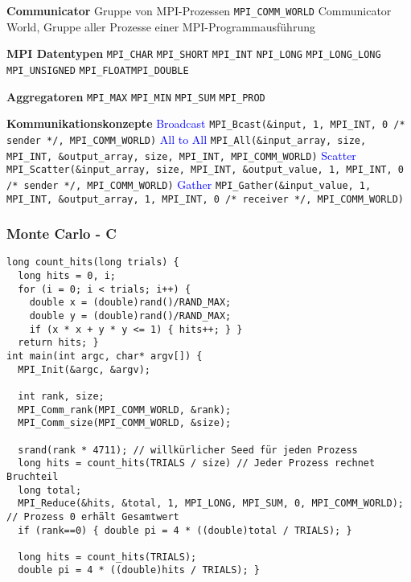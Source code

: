 \textbf{Communicator} Gruppe von MPI-Prozessen \lstinline{MPI_COMM_WORLD} Communicator World, Gruppe aller Prozesse einer MPI-Programmausführung

\textbf{MPI Datentypen} \lstinline{MPI_CHAR} \lstinline{MPI_SHORT} \lstinline{MPI_INT} \lstinline{NPI_LONG} \lstinline{MPI_LONG_LONG} \lstinline{MPI_UNSIGNED} \lstinline{MPI_FLOAT}\lstinline{MPI_DOUBLE}

\textbf{Aggregatoren} \lstinline{MPI_MAX} \lstinline{MPI_MIN} \lstinline{MPI_SUM} \lstinline{MPI_PROD}

\textbf{Kommunikationskonzepte}
\textcolor{blue}{Broadcast} \lstinline{MPI_Bcast(&input, 1, MPI_INT, 0 /* sender */, MPI_COMM_WORLD)}
\textcolor{blue}{All to All} \lstinline{MPI_All(&input_array, size, MPI_INT, &output_array, size, MPI_INT, MPI_COMM_WORLD)}
\textcolor{blue}{Scatter} \lstinline{MPI_Scatter(&input_array, size, MPI_INT, &output_value, 1, MPI_INT, 0 /* sender */, MPI_COMM_WORLD)}
\textcolor{blue}{Gather} \lstinline{MPI_Gather(&input_value, 1, MPI_INT, &output_array, 1, MPI_INT, 0 /* receiver */, MPI_COMM_WORLD)}

\subsubsection{Monte Carlo - C}

\begin{lstlisting}
long count_hits(long trials) {
  long hits = 0, i;
  for (i = 0; i < trials; i++) {
    double x = (double)rand()/RAND_MAX;
    double y = (double)rand()/RAND_MAX;
    if (x * x + y * y <= 1) { hits++; } }
  return hits; }
int main(int argc, char* argv[]) {
  MPI_Init(&argc, &argv);

  int rank, size;
  MPI_Comm_rank(MPI_COMM_WORLD, &rank);
  MPI_Comm_size(MPI_COMM_WORLD, &size);

  srand(rank * 4711); // willkürlicher Seed für jeden Prozess
  long hits = count_hits(TRIALS / size) // Jeder Prozess rechnet Bruchteil
  long total;
  MPI_Reduce(&hits, &total, 1, MPI_LONG, MPI_SUM, 0, MPI_COMM_WORLD); // Prozess 0 erhält Gesamtwert
  if (rank==0) { double pi = 4 * ((double)total / TRIALS); }

  long hits = count_hits(TRIALS);
  double pi = 4 * ((double)hits / TRIALS); }
\end{lstlisting}
